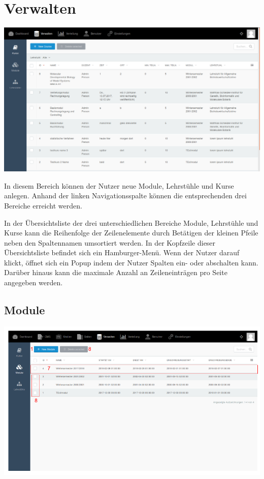   
  \section{Verwalten}
  \label{section:manage}
  
    \includegraphics[scale=0.3]{backend/img/verwalten.png}

    In diesem Bereich können der Nutzer neue Module, Lehrstühle und Kurse anlegen.
    Anhand der linken Navigationsspalte können die entsprechenden drei Bereiche erreicht werden.

    In der Übersichtsliste der drei unterschiedlichen Bereiche Module, Lehrstühle und Kurse kann die Reihenfolge der Zeilenelemente durch Betätigen
    der kleinen Pfeile neben den Spaltennamen umsortiert werden.
    In der Kopfzeile dieser Übersichtsliste befindet sich ein Hamburger-Menü. 
    Wenn der Nutzer darauf klickt, öffnet sich ein Popup indem der Nutzer Spalten ein- oder abschalten kann.
    Darüber hinaus kann die maximale Anzahl an Zeileneinträgen pro Seite angegeben werden.
    
    \subsection{Module}
    
    \includegraphics[scale=0.3]{backend/img/module_1.png}

